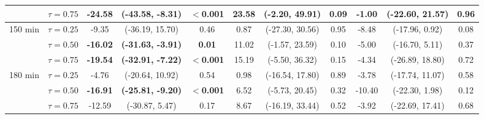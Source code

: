 \begin{table}[ht]
{\begin{tabular}{llccccccccc}
 & $\tau=0.75$ & \textbf{-24.58} & \textbf{(-43.58, -8.31)} & \textbf{$<$0.001} & 23.58 & (-2.20, 49.91) & 0.09 & -1.00 & (-22.60, 21.57) & 0.96 \\
\midrule
\multirow{3}{*}{150 min} & $\tau=0.25$ & -9.35 & (-36.19, 15.70) & 0.46 & 0.87 & (-27.30, 30.56) & 0.95 & -8.48 & (-17.96, 0.92) & 0.08 \\
 & $\tau=0.50$ & \textbf{-16.02} & \textbf{(-31.63, -3.91)} & \textbf{0.01} & 11.02 & (-1.57, 23.59) & 0.10 & -5.00 & (-16.70, 5.11) & 0.37 \\
 & $\tau=0.75$ & \textbf{-19.54} & \textbf{(-32.91, -7.22)} & \textbf{$<$0.001} & 15.19 & (-5.50, 36.32) & 0.15 & -4.34 & (-26.89, 18.80) & 0.72 \\
\midrule
\multirow{3}{*}{180 min} & $\tau=0.25$ & -4.76 & (-20.64, 10.92) & 0.54 & 0.98 & (-16.54, 17.80) & 0.89 & -3.78 & (-17.74, 11.07) & 0.58 \\
 & $\tau=0.50$ & \textbf{-16.91} & \textbf{(-25.81, -9.20)} & \textbf{$<$0.001} & 6.52 & (-5.73, 20.45) & 0.32 & -10.40 & (-22.30, 1.98) & 0.12 \\
 & $\tau=0.75$ & -12.59 & (-30.87, 5.47) & 0.17 & 8.67 & (-16.19, 33.44) & 0.52 & -3.92 & (-22.69, 17.41) & 0.68 \\
\bottomrule
\end{tabular}%
}
\end{table}
